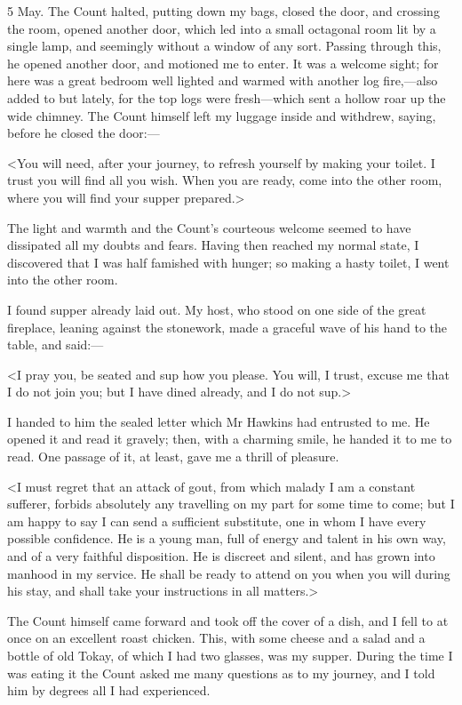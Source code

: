 \begin{diary}{5 May.}
The Count halted, putting down my bags, closed the door, and crossing the room, opened another door, which led into a small octagonal room lit by a single lamp, and seemingly without a window of any sort. Passing through this, he opened another door, and motioned me to enter. It was a welcome sight; for here was a great bedroom well lighted and warmed with another log fire,—also added to but lately, for the top logs were fresh—which sent a hollow roar up the wide chimney. The Count himself left my luggage inside and withdrew, saying, before he closed the door:—

<You will need, after your journey, to refresh yourself by making your toilet. I trust you will find all you wish. When you are ready, come into the other room, where you will find your supper prepared.>

The light and warmth and the Count's courteous welcome seemed to have dissipated all my doubts and fears. Having then reached my normal state, I discovered that I was half famished with hunger; so making a hasty toilet, I went into the other room.

I found supper already laid out. My host, who stood on one side of the great fireplace, leaning against the stonework, made a graceful wave of his hand to the table, and said:—

<I pray you, be seated and sup how you please. You will, I trust, excuse me that I do not join you; but I have dined already, and I do not sup.>

I handed to him the sealed letter which Mr Hawkins had entrusted to me. He opened it and read it gravely; then, with a charming smile, he handed it to me to read. One passage of it, at least, gave me a thrill of pleasure.

<I must regret that an attack of gout, from which malady I am a constant sufferer, forbids absolutely any travelling on my part for some time to come; but I am happy to say I can send a sufficient substitute, one in whom I have every possible confidence. He is a young man, full of energy and talent in his own way, and of a very faithful disposition. He is discreet and silent, and has grown into manhood in my service. He shall be ready to attend on you when you will during his stay, and shall take your instructions in all matters.>

The Count himself came forward and took off the cover of a dish, and I fell to at once on an excellent roast chicken. This, with some cheese and a salad and a bottle of old Tokay, of which I had two glasses, was my supper. During the time I was eating it the Count asked me many questions as to my journey, and I told him by degrees all I had experienced.


\end{diary}
